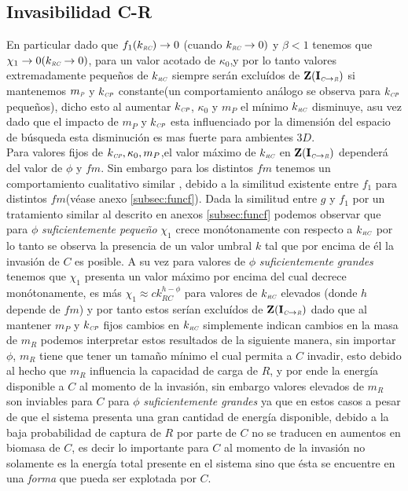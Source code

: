\subsection{Invasibilidad C-R}\label{subsec:InvCR}

En particular dado que $f_1(k_{\textit{\tiny RC}}) \to 0$ (cuando $k_{\textit{\tiny RC}} \to 0)$ y $\beta <1$ tenemos que $\chi_1 \to 0 (k_{\textit{\tiny RC}} \to 0)$, para un valor acotado de $\kappa_0$,y por lo tanto valores extremadamente peque\~nos de $k_{\textit{\tiny RC}}$ siempre ser\'an exclu\'idos de $\mathbf{Z(I_{\textit{\tiny C}\to \textit{\tiny R}})}$ si mantenemos $m_{\textit{\tiny P}}$ y $k_{\textit{\tiny CP}}$ constante(un comportamiento an\'alogo se observa para $k_{\textit{\tiny CP}}$ peque\~nos), dicho esto al aumentar $k_{\textit{\tiny CP}}$, $\kappa_0$ y $m_P$ el m\'inimo $k_{\textit{\tiny RC}}$ disminuye, asu vez dado que el impacto de $m_P$ y $k_{\textit{\tiny CP}}$ esta influenciado por la dimensi\'on del espacio de b\'usqueda esta disminuci\'on es mas fuerte para ambientes $3D$.\\

Para valores fijos de $k_{\textit{\tiny CP}}, \kappa_0 ,m_P$,el valor m\'aximo de $k_{\textit{\tiny RC}}$ en $\mathbf{Z(I_{\textit{\tiny C}\to \textit{\tiny R}})}$ depender\'a del valor de $\phi$ y $fm$. Sin embargo para los distintos $fm$ tenemos un comportamiento cualitativo similar , debido a la similitud existente entre $f_1$ para distintos $fm$(v\'ease anexo \ref{subsec:funcf}). Dada la similitud entre $g$ y $f_1$ por un tratamiento similar al descrito en anexos \ref{subsec:funcf} podemos observar que para $\phi$ \emph{suficientemente peque\~no} $\chi_1$ crece mon\'otonamente con respecto a $k_{\textit{\tiny RC}}$ por lo tanto se observa la presencia de un valor umbral $k$ tal que por encima de \'el la invasi\'on de $C$ es posible. A su vez para valores de $\phi$ \emph{suficientemente grandes} tenemos que $\chi_1$ presenta un valor m\'aximo por encima del cual decrece mon\'otonamente, es m\'as $\chi_1 \approx c k_{RC}^{h - \phi}$ para valores de $k_{\textit{\tiny RC}}$ elevados (donde $h$ depende de $fm$) y por tanto estos ser\'ian exclu\'idos de $\mathbf{Z(I_{\textit{\tiny C}\to \textit{\tiny R}})}$ dado que al mantener $m_P$ y $k_{\textit{\tiny CP}}$ fijos cambios en $k_{\textit{\tiny RC}}$ simplemente indican cambios en la masa de $m_R$ podemos interpretar estos resultados de la siguiente manera, sin importar $\phi$, $m_R$ tiene que tener un tama\~no m\'inimo el cual permita a $C$ invadir, esto debido al hecho que $m_R$ influencia la capacidad de carga de $R$, y por ende la energ\'ia disponible a $C$ al momento de la invasi\'on, sin embargo valores elevados de $m_R$ son inviables para $C$ para $\phi$ \emph{suficientemente grandes} ya que en estos casos a pesar de que el sistema presenta una gran cantidad de energ\'ia disponible, debido a la baja probabilidad de captura de $R$ por parte de $C$ no se traducen en aumentos en biomasa de $C$, es decir lo importante para $C$ al momento de la invasi\'on no solamente es la energ\'ia total presente en el sistema sino que \'esta se encuentre en una \emph{forma} que pueda ser explotada por $C$.\\

